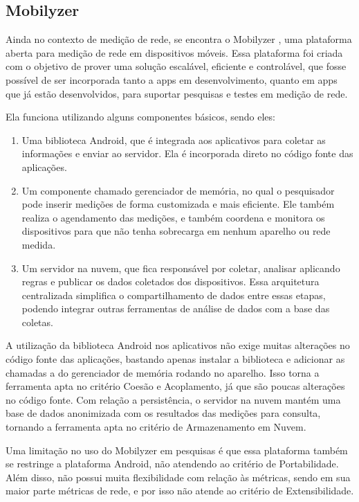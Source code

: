 \documentclass[12pt]{tcc}
\begin{document}
	\subsection{Mobilyzer}
	\par Ainda no contexto de medição de rede, se encontra o Mobilyzer \citep{Nikravesh2015Mobilyzer}, uma plataforma aberta para medição de rede em dispositivos móveis. Essa plataforma foi criada com o objetivo de prover uma solução escalável, eficiente e controlável, que fosse possível de ser incorporada tanto a apps em desenvolvimento, quanto em apps que já estão desenvolvidos, para suportar pesquisas e testes em medição de rede. 
	\par Ela funciona utilizando alguns componentes básicos, sendo eles: 
	\begin{enumerate}
		\item Uma biblioteca Android, que é integrada aos aplicativos para coletar as informações e enviar ao servidor. Ela é incorporada direto no código fonte das aplicações.
		\item Um componente chamado gerenciador de memória, no qual o pesquisador pode inserir medições de forma customizada e mais eficiente. Ele também realiza o agendamento das medições, e também coordena e monitora os dispositivos para que não tenha sobrecarga em nenhum aparelho ou rede medida. 
		\item Um servidor na nuvem, que fica responsável por coletar, analisar aplicando regras e publicar os dados coletados dos dispositivos. Essa arquitetura centralizada simplifica o compartilhamento de dados entre essas etapas, podendo integrar outras ferramentas de análise de dados com a base das coletas.

	\end{enumerate}

	A utilização da biblioteca Android nos aplicativos não exige muitas alterações no código fonte das aplicações, bastando apenas instalar a biblioteca e adicionar as chamadas a  do gerenciador de memória rodando no aparelho. Isso torna a ferramenta apta no critério Coesão e Acoplamento, já que são poucas alterações no código fonte. Com relação a persistência, o servidor na nuvem mantém uma base de dados anonimizada com os resultados das medições para consulta, tornando a ferramenta apta no critério de Armazenamento em Nuvem.

	Uma limitação no uso do Mobilyzer em pesquisas é que essa plataforma também se restringe a plataforma Android, não atendendo ao critério de Portabilidade. Além disso, não possui muita flexibilidade com relação às métricas, sendo em sua maior parte métricas de rede, e por isso não atende ao critério de Extensibilidade.
		
\end{document}
